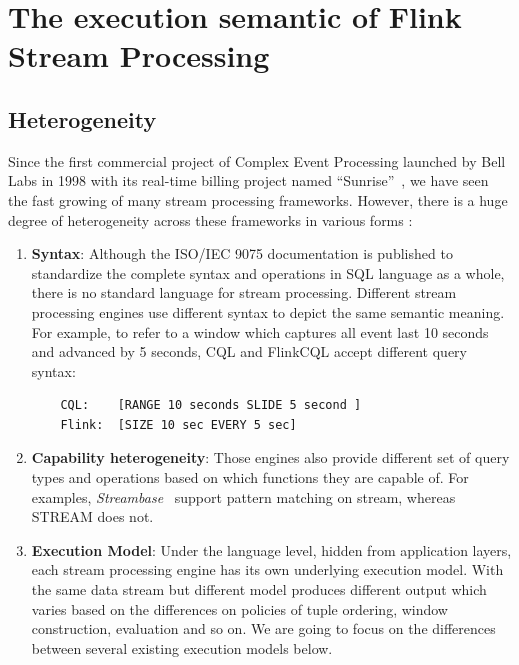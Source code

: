 
\chapter{The execution semantic of Flink Stream Processing}

\ifpdf
    \graphicspath{{Chapter3/Figs/Raster/}{Chapter3/Figs/PDF/}{Chapter3/Figs/}}
\else
    \graphicspath{{Chapter3/Figs/Vector/}{Chapter3/Figs/}}
\fi

\section{Heterogeneity}\label{Heterogeneity}
Since the first commercial project of Complex Event Processing launched by Bell Labs in 1998 with its real-time billing project named ``Sunrise''~\citep{Belllab}, we have seen the fast growing of many stream processing frameworks. However, there is a huge degree of heterogeneity across these frameworks in various forms \citep{Dindar:2013}: 

\begin{enumerate}

	\item \textbf{Syntax}: Although the ISO/IEC 9075 documentation is published to standardize the complete syntax and operations in SQL language as a whole, there is no standard language for stream processing. Different stream processing engines use different syntax to depict the same semantic meaning. For example, to refer to a window which captures all event last 10 seconds and advanced by 5 seconds, CQL and FlinkCQL accept different query syntax:
	\begin{verbatim}
	CQL: 	[RANGE 10 seconds SLIDE 5 second ] 
	Flink: 	[SIZE 10 sec EVERY 5 sec]
	\end{verbatim}
	
	\item \textbf{Capability heterogeneity}:
	Those engines also provide different set of query types and operations based on which functions they are capable of. For examples, \textit{Streambase}~\citep{StreamBaseTut} support pattern matching on stream, whereas STREAM does not.
	
	\item \textbf{Execution Model}: Under the language level, hidden from application layers, each stream processing engine has its own underlying execution model. With the same data stream but different model produces different output which varies based on the differences on policies of tuple ordering,  window construction, evaluation and so on. We are going to focus on the differences between several existing execution models below.
	
\end{enumerate}
 
